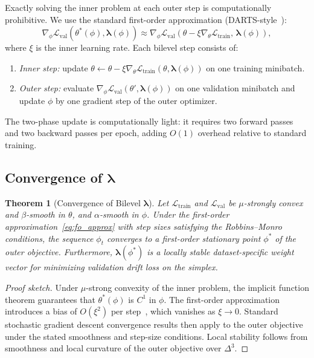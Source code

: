 \documentclass[lettersize,journal]{IEEEtran}
\newtheorem{theorem}{Theorem}
\newcommand{\calL}{\mathcal{L}}
\newcommand{\lambdavec}{\boldsymbol{\lambda}}
\begin{document}
Exactly solving the inner problem at each outer step is
computationally prohibitive.
We use the standard first-order approximation
(DARTS-style~\cite{liu2019darts}):
\begin{equation}
  \nabla_\phi \calL_{\text{val}}(\theta^*(\phi), \lambdavec(\phi))
  \approx
  \nabla_\phi \calL_{\text{val}}(\theta - \xi \nabla_\theta
    \calL_{\text{train}}, \, \lambdavec(\phi)),
  \label{eq:fo_approx}
\end{equation}
where $\xi$ is the inner learning rate.
Each bilevel step consists of:
\begin{enumerate}
  \item \textit{Inner step:} update $\theta \leftarrow \theta - \xi
    \nabla_\theta \calL_{\text{train}}(\theta, \lambdavec(\phi))$
    on one training minibatch.
  \item \textit{Outer step:} evaluate
    $\nabla_\phi \calL_{\text{val}}(\theta', \lambdavec(\phi))$
    on one validation minibatch and update $\phi$ by one gradient
    step of the outer optimizer.
\end{enumerate}
The two-phase update is computationally light: it requires two
forward passes and two backward passes per epoch, adding $O(1)$
overhead relative to standard training.

\subsection{Convergence of $\lambdavec$}

\begin{theorem}[Convergence of Bilevel $\lambdavec$]
\label{thm:lambda_convergence}
Let $\calL_{\text{train}}$ and $\calL_{\text{val}}$ be $\mu$-strongly
convex and $\beta$-smooth in $\theta$, and $\alpha$-smooth in $\phi$.
Under the first-order approximation~\eqref{eq:fo_approx} with
step sizes satisfying the Robbins--Monro conditions, the sequence
$\phi_t$ converges to a first-order stationary point
$\phi^*$ of the outer objective.
Furthermore, $\lambdavec(\phi^*)$ is a locally stable
dataset-specific weight vector for minimizing validation drift loss
on the simplex.
\end{theorem}

\begin{proof}[Proof sketch]
Under $\mu$-strong convexity of the inner problem,
the implicit function theorem guarantees that $\theta^*(\phi)$
is $C^1$ in $\phi$.
The first-order approximation introduces a bias of
$O(\xi^2)$ per step~\cite{liu2019darts}, which vanishes as
$\xi \to 0$.
Standard stochastic gradient descent convergence results
then apply to the outer objective under the stated smoothness
and step-size conditions.
Local stability follows from smoothness and local curvature of the
outer objective over $\Delta^3$.
\end{proof}
\end{document}
